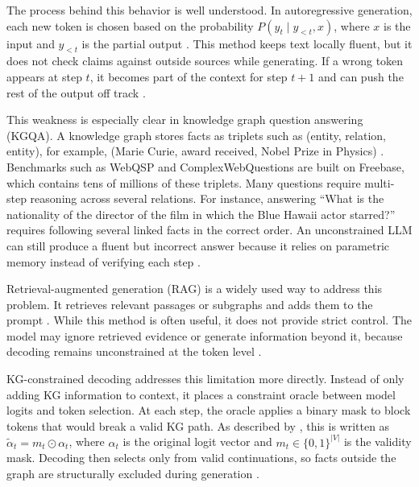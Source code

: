 The process behind this behavior is well understood. In autoregressive generation, each new token is chosen based on the probability $P(y_t \mid y_{<t}, x)$, where $x$ is the input and $y_{<t}$ is the partial output \citep{brown2020gpt3}. This method keeps text locally fluent, but it does not check claims against outside sources while generating. If a wrong token appears at step $t$, it becomes part of the context for step $t+1$ and can push the rest of the output off track \citep{huang2023survey,ji2023survey}.

This weakness is especially clear in knowledge graph question answering (KGQA). A knowledge graph stores facts as triplets such as (entity, relation, entity), for example, (Marie Curie, award received, Nobel Prize in Physics) \citep{bollacker2008freebase}. Benchmarks such as WebQSP \citep{yih2016websqp} and ComplexWebQuestions \citep{talmor2018cwq} are built on Freebase, which contains tens of millions of these triplets. Many questions require multi-step reasoning across several relations. For instance, answering ``What is the nationality of the director of the film in which the Blue Hawaii actor starred?'' requires following several linked facts in the correct order. An unconstrained LLM can still produce a fluent but incorrect answer because it relies on parametric memory instead of verifying each step \citep{lan2022survey,he2021improving}.

Retrieval-augmented generation (RAG) is a widely used way to address this problem. It retrieves relevant passages or subgraphs and adds them to the prompt \citep{lewis2020rag,izacard2021leveraging}. While this method is often useful, it does not provide strict control. The model may ignore retrieved evidence or generate information beyond it, because decoding remains unconstrained at the token level \citep{asai2024selfrag,agrawal2024mindfulrag}.

KG-constrained decoding addresses this limitation more directly. Instead of only adding KG information to context, it places a constraint oracle between model logits and token selection. At each step, the oracle applies a binary mask to block tokens that would break a valid KG path. As described by \citet{geng2023grammarconstrained}, this is written as $\tilde{\alpha}_t = m_t \odot \alpha_t$, where $\alpha_t$ is the original logit vector and $m_t \in \{0,1\}^{|V|}$ is the validity mask. Decoding then selects only from valid continuations, so facts outside the graph are structurally excluded during generation \citep{willard2023outlines,geng2023grammarconstrained}.

